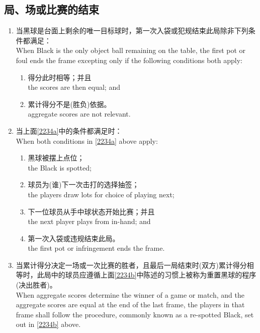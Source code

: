 \subsection{局、场或比赛的结束}\label{2234}

\begin{enumerate}[label=(\alph*)]
    \item \label{2234a}当黑球是台面上剩余的唯一目标球时，第一次入袋或犯规结束此局除非下列条件都满足：\\
    When Black is the only object ball remaining on the table, the first pot or foul ends the frame excepting only if the following conditions both apply:
    \begin{enumerate}[label=(\roman*)]
        \item 得分此时相等；并且\\
        the scores are then equal; and
        \item 累计得分不是(胜负)依据。\\
        aggregate scores are not relevant.
    \end{enumerate}
    \item \label{2234b}当上面\ref{2234a}中的条件都满足时：\\
    When both conditions in \ref{2234a} above apply:
    \begin{enumerate}[label=(\roman*)]
        \item 黑球被摆上点位；\\
        the Black is spotted;
        \item 球员为(谁)下一次击打的选择抽签；\\
        the players draw lots for choice of playing next;
        \item 下一位球员从手中球状态开始比赛；并且\\
        the next player plays from in-hand; and
        \item 第一次入袋或违规结束此局。\\
        the first pot or infringement ends the frame.
    \end{enumerate}
    \item 当累计得分决定一场或一次比赛的胜者，且最后一局结束时(双方)累计得分相等时，此局中的球员应遵循上面\ref{2234b}中陈述的习惯上被称为重置黑球的程序(决出胜者)。\\
    When aggregate scores determine the winner of a game or match, and the aggregate scores are equal at the end of the last frame, the players in that frame shall follow the procedure, commonly known as a re-spotted Black, set out in \ref{2234b} above.
\end{enumerate}

